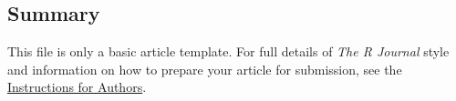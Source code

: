 \hypertarget{summary}{%
\subsection{Summary}\label{summary}}

This file is only a basic article template. For full details of
\emph{The R Journal} style and information on how to prepare your
article for submission, see the
\href{https://journal.r-project.org/share/author-guide.pdf}{Instructions
for Authors}.



\address{%
Maciej Beręsewicz\\
Poznań University of Economics and Business\\%
Al. Niepodległości 10\\ 61-875 Poznań, Poland\\
Statistical Office in Poznań\\%
ul. Wojska Polskiego 27/29\\ 60-624 Poznań, Poland\\
%
\url{https://ncn-foreigners.github.io/}\\%
\textit{ORCiD: \href{https://orcid.org/0000-0002-8281-4301}{0000-0002-8281-4301}}\\%
\href{mailto:maciej.beresewicz@ue.poznan.pl}{\nolinkurl{maciej.beresewicz@ue.poznan.pl}}%
}

\address{%
Piotr Chlebicki\\
Adam Mickiewicz University\\%
ul. Wieniawskiego 1\\ 61-712 Poznań, Poland\\
%
\url{https://github.com/Kertoo}\\%
%
\href{mailto:piochl@st.amu.edu.pl}{\nolinkurl{piochl@st.amu.edu.pl}}%
}
